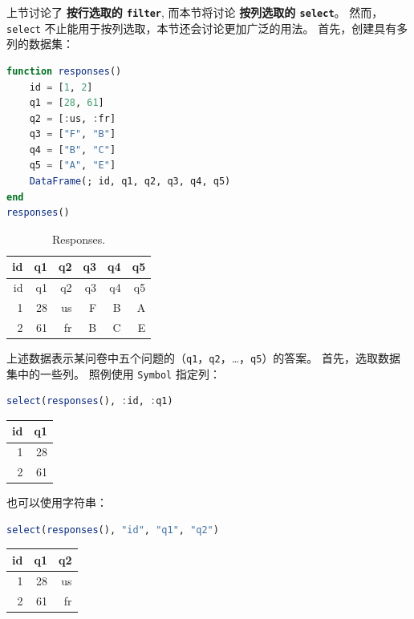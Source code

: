 \documentclass[
  notoc %
]{tufte-book}
\newcommand{\passthrough}[1]{#1}
\begin{document}
上节讨论了 \textbf{按行选取的 \passthrough{\lstinline!filter!}},
而本节将讨论 \textbf{按列选取的 \passthrough{\lstinline!select!}}。
然而， \passthrough{\lstinline!select!}
不止能用于按列选取，本节还会讨论更加广泛的用法。
首先，创建具有多列的数据集：

\begin{lstlisting}[language=Julia]
function responses()
    id = [1, 2]
    q1 = [28, 61]
    q2 = [:us, :fr]
    q3 = ["F", "B"]
    q4 = ["B", "C"]
    q5 = ["A", "E"]
    DataFrame(; id, q1, q2, q3, q4, q5)
end
responses()
\end{lstlisting}

\hypertarget{tbl:responses}{}
\begin{longtable}[]{@{}rrrrrr@{}}
\caption{\label{tbl:responses}Responses.}\tabularnewline
\toprule
id & q1 & q2 & q3 & q4 & q5 \\
\midrule
\endfirsthead
\toprule
id & q1 & q2 & q3 & q4 & q5 \\
\midrule
\endhead
1 & 28 & us & F & B & A \\
2 & 61 & fr & B & C & E \\
\bottomrule
\end{longtable}

上述数据表示某问卷中五个问题的（\passthrough{\lstinline!q1!}，\passthrough{\lstinline!q2!}，\ldots，\passthrough{\lstinline!q5!}）的答案。
首先，选取数据集中的一些列。 照例使用 \passthrough{\lstinline!Symbol!}
指定列：

\begin{lstlisting}[language=Julia]
select(responses(), :id, :q1)
\end{lstlisting}

\begin{longtable}[]{@{}rr@{}}
\toprule
id & q1 \\
\midrule
\endhead
1 & 28 \\
2 & 61 \\
\bottomrule
\end{longtable}

也可以使用字符串：

\begin{lstlisting}[language=Julia]
select(responses(), "id", "q1", "q2")
\end{lstlisting}

\begin{longtable}[]{@{}rrr@{}}
\toprule
id & q1 & q2 \\
\midrule
\endhead
1 & 28 & us \\
2 & 61 & fr \\
\bottomrule
\end{longtable}
\end{document}
